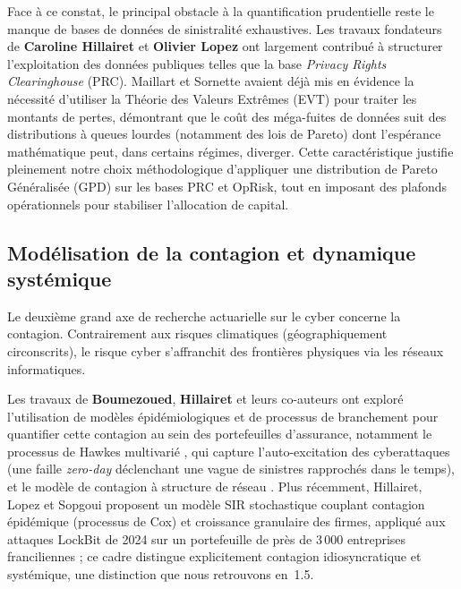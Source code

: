 \documentclass[11pt,a4paper]{article}
\theoremstyle{navystyle}
\theoremstyle{navydef}
\begin{document}
Face à ce constat, le principal obstacle à la quantification prudentielle reste le manque de bases de données de sinistralité exhaustives. Les travaux fondateurs de \textbf{Caroline Hillairet} et \textbf{Olivier Lopez} \citep{HillairetLopez2021} ont largement contribué à structurer l'exploitation des données publiques telles que la base \textit{Privacy Rights Clearinghouse} (PRC). Maillart et Sornette \citep{MaillartSornette2010} avaient déjà mis en évidence la nécessité d'utiliser la Théorie des Valeurs Extrêmes (EVT) pour traiter les montants de pertes, démontrant que le coût des méga-fuites de données suit des distributions à queues lourdes (notamment des lois de Pareto) dont l'espérance mathématique peut, dans certains régimes, diverger. Cette caractéristique justifie pleinement notre choix méthodologique d'appliquer une distribution de Pareto Généralisée (GPD) sur les bases PRC et OpRisk, tout en imposant des plafonds opérationnels pour stabiliser l'allocation de capital.

\subsection{Modélisation de la contagion et dynamique systémique}

Le deuxième grand axe de recherche actuarielle sur le cyber concerne la contagion. Contrairement aux risques climatiques (géographiquement circonscrits), le risque cyber s'affranchit des frontières physiques via les réseaux informatiques. 

Les travaux de \textbf{Boumezoued}, \textbf{Hillairet} et leurs co-auteurs ont exploré l'utilisation de modèles épidémiologiques et de processus de branchement pour quantifier cette contagion au sein des portefeuilles d'assurance, notamment le processus de Hawkes multivarié \citep{BessyRolandBoumezouedHillairet2021}, qui capture l'auto-excitation des cyberattaques (une faille \textit{zero-day} déclenchant une vague de sinistres rapprochés dans le temps), et le modèle de contagion à structure de réseau \citep{HillairetLopezDOultremontSpoorenberg2022}. Plus récemment, Hillairet, Lopez et Sopgoui \citep{HillairetLopezSopgoui2026} proposent un modèle SIR stochastique couplant contagion épidémique (processus de Cox) et croissance granulaire des firmes, appliqué aux attaques LockBit de 2024 sur un portefeuille de près de 3\,000 entreprises franciliennes ; ce cadre distingue explicitement contagion idiosyncratique et systémique, une distinction que nous retrouvons en~1.5.
\end{document}
